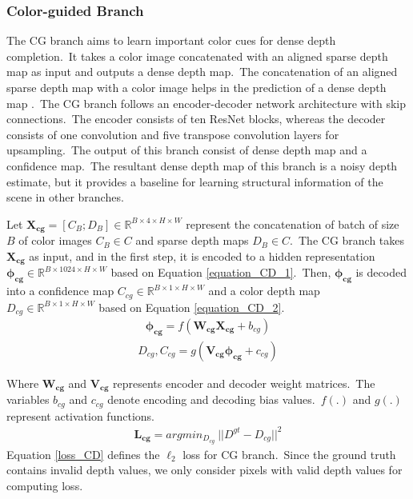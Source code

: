 \documentclass{ieeeaccess}
\begin{document}
\subsubsection{Color-guided Branch}
The CG branch aims to learn important color cues for dense depth completion.~It takes a color image concatenated with an aligned sparse depth map as input and outputs a dense depth map.~The concatenation of an aligned sparse depth map with a color image helps in the prediction of a dense depth map \cite{hu2020PENet}.~The CG branch follows an encoder-decoder network architecture with skip connections.~The encoder consists of ten ResNet \cite{he2016deep} blocks, whereas the decoder consists of one convolution and five transpose convolution layers for upsampling.~The output of this branch consist of dense depth map and a confidence map.~The resultant dense depth map of this branch is a noisy depth estimate, but it provides a baseline for learning structural information of the scene in other branches.

Let $ \mathbf{X_{cg}} =  \left[C_B;D_B \right] \in \mathbb{R}^{B \times 4 \times H \times W}$ represent the concatenation of batch of size $B$ of color images $ C_B \in C$ and sparse depth maps $D_B \in C$.~The CG branch takes $\mathbf{X_{cg}}$ as input, and in the first step, it is encoded to a hidden representation $\mathbf{\phi_{cg}} \in \mathbb{R}^{B \times 1024 \times H \times W}$ based on Equation \ref{equation_CD_1}.~Then, $\mathbf{\phi_{cg}}$ is decoded into a confidence map $C_{cg} \in  \mathbb{R}^{B \times 1 \times H \times W}$  and a color depth map $D_{cg} \in  \mathbb{R}^{B \times 1 \times H \times W}$ based on Equation \ref{equation_CD_2}. 
\begin{equation}
    \begin{aligned}
            \mathbf{\phi_{cg}} =   f(\mathbf{W_{cg}}\mathbf{X_{cg}} + b_{cg})
    \end{aligned}
    \label{equation_CD_1}
\end{equation}
\begin{equation}
    \begin{aligned}
            D_{cg}, C_{cg} =   g(\mathbf{V_{cg}}\mathbf{\phi_{cg}} + c_{cg})
    \end{aligned}
    \label{equation_CD_2}
\end{equation}

Where $\mathbf{W_{cg}}$ and $\mathbf{V_{cg}}$ represents encoder and decoder weight matrices.~The variables  $b_{cg}$ and $c_{cg}$ denote encoding and decoding bias values.~$f(.)$ and $g(.)$ represent activation functions.
\begin{equation}
    \begin{aligned}
            \mathbf{L_{cg}} =   argmin_{D_{cg}} \ || D ^{gt} - D_{cg} ||^2
    \end{aligned}
    \label{loss_CD}
\end{equation}
Equation \ref{loss_CD} defines the $\ell_2$ loss for CG branch.~Since the ground truth contains invalid depth values, we only consider pixels with valid depth values for computing loss.
\end{document}
